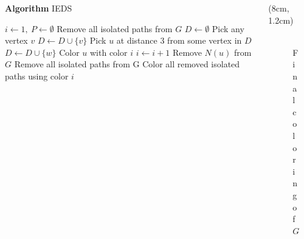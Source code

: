 {  \begin{columns}
    \begin{column}{0.5\textwidth}
      \begin{algorithm}[H]
        \caption*{\textbf{Algorithm} IEDS}
        \scriptsize
        \begin{algorithmic}[1]
        \State $i \gets 1,\ P \gets \emptyset$
        \State Remove all isolated paths from $G$
          \State $D \gets \emptyset$
            \State Pick any vertex $v$
            \State $D \gets D \cup \{ v \}$
              \State Pick $u$ at distance 3 from some vertex in $D$
              \State $D \gets D \cup \{ w \}$
            \EndWhile
              \State Color $u$ with color $i$
            \EndFor
            \State $i \gets i + 1$
              \State Remove $N(u)$ from $G$
            \EndFor
            \State Remove all isolated paths from G
          \EndFor
        \EndWhile
        \State Color all removed isolated paths using color $i$
        \end{algorithmic}
      \end{algorithm}
    \end{column}
    \begin{column}{0.5\textwidth}
      \begin{center}
        \begin{textblock*}{8cm}(8cm, 1.2cm) %
          \begin{figure}
            \centering
            \includegraphics[width=5.7cm]{../figures/algorithm1-step3.pdf}
            \caption*{Final coloring of $G$}
          \end{figure}
        \end{textblock*}

      \end{center}
    \end{column}
  \end{columns}
}
